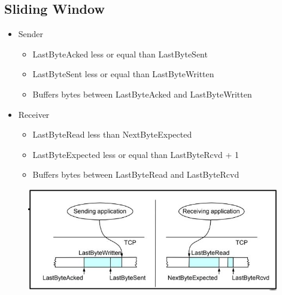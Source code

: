 \documentclass[../resumosRCOM.tex]{subfiles}
\begin{document}
\subsection{Sliding Window}
\begin{itemize}
    \item Sender
    \begin{itemize}
        \item LastByteAcked less or equal than LastByteSent
        \item LastByteSent less or equal than LastByteWritten
        \item Buffers bytes between LastByteAcked and LastByteWritten
    \end{itemize}
    \item Receiver
    \begin{itemize}
        \item LastByteRead less than NextByteExpected
        \item LastByteExpected less or equal than LastByteRcvd + 1
        \item Buffers bytes between LastByteRead and LastByteRcvd
    \end{itemize}
\end{itemize}
\begin{figure}[h]
    \centering
    \includegraphics[width=11cm]{images/trans9.JPG}
\end{figure}
\end{document}
